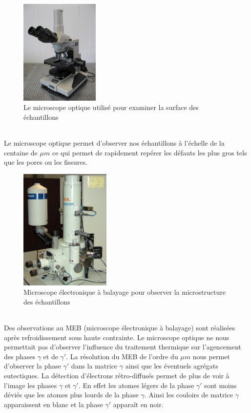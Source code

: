 \begin{figure}[H]
    \centering
    \includegraphics[width=0.35\textwidth]{images/optique.jpg}
    \caption{Le microscope optique utilisé pour examiner la surface des échantillons}
    \label{<label>}
\end{figure}
\\
Le microscope optique permet d'observer nos échantillons à l'échelle de la centaine de $\mu m$ ce qui permet de rapidement repérer les défauts les plus gros tels que les pores ou les fissures.
\\


\begin{figure}[H]
    \centering
    \includegraphics[width=0.4\textwidth]{images/JEOL_JSM-6340F.jpg}
    \caption{Microscope électronique à balayage pour observer la microstructure des échantillons}
    \label{<label>}
\end{figure}
\\
Des observations au MEB (microscope électronique à balayage) sont réalisées après refroidissement sous haute contrainte. Le microscope optique ne nous permettait pas d'observer l'influence du traitement thermique sur l'agencement des phases $\gamma$ et de $\gamma'$. La résolution du MEB de l'ordre du $\mu m$ nous permet d'observer la phase $\gamma'$ dans la matrice $\gamma$ ainsi que les éventuels agrégats eutectiques. La détection d'électrons rétro-diffusés permet de plus de voir à l'image les phases $\gamma$ et $\gamma'$. En effet les atomes légers de la phase $\gamma'$ sont moins déviés que les atomes plus lourds de la phase $\gamma$. Ainsi les couloirs de matrice $\gamma$ apparaissent en blanc et la phase $\gamma'$ apparaît en noir.
\newpage

